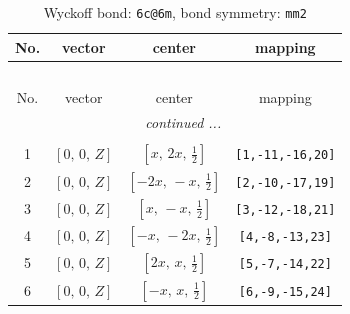 \documentclass[fleqn,8pt]{jsarticle}
\begin{document}
\begin{longtable}{cccc}
\caption{Wyckoff bond: {\tt 6c@6m}, bond symmetry: {\tt mm2}}
 \\
 \hline \hline
No. & vector & center & mapping \\ \hline \endfirsthead

\multicolumn{3}{l}{\tablename\ \thetable{}} \\
 \hline \hline
No. & vector & center & mapping \\ \hline \endhead

 \hline \hline
\multicolumn{3}{r}{\footnotesize\it continued ...} \\ \endfoot

 \hline \hline
\multicolumn{3}{r}{} \\ \endlastfoot

1 & $\left[ 0,\, 0,\, Z \right]$ & $\left[ x,\, 2 x,\, \frac{1}{2} \right]$ & {\tt [1,-11,-16,20]} \\ \hline
2 & $\left[ 0,\, 0,\, Z \right]$ & $\left[ - 2 x,\, - x,\, \frac{1}{2} \right]$ & {\tt [2,-10,-17,19]} \\ \hline
3 & $\left[ 0,\, 0,\, Z \right]$ & $\left[ x,\, - x,\, \frac{1}{2} \right]$ & {\tt [3,-12,-18,21]} \\ \hline
4 & $\left[ 0,\, 0,\, Z \right]$ & $\left[ - x,\, - 2 x,\, \frac{1}{2} \right]$ & {\tt [4,-8,-13,23]} \\ \hline
5 & $\left[ 0,\, 0,\, Z \right]$ & $\left[ 2 x,\, x,\, \frac{1}{2} \right]$ & {\tt [5,-7,-14,22]} \\ \hline
6 & $\left[ 0,\, 0,\, Z \right]$ & $\left[ - x,\, x,\, \frac{1}{2} \right]$ & {\tt [6,-9,-15,24]} \\
\end{longtable}
\renewcommand{\arraystretch}{1.2}
\end{document}
